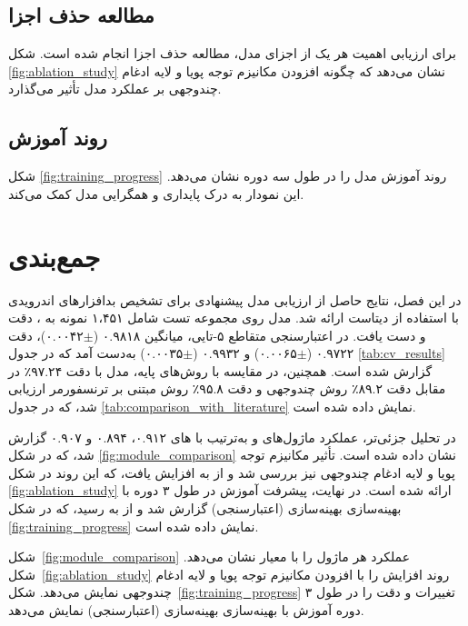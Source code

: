 \subsection{مطالعه حذف اجزا}
برای ارزیابی اهمیت هر یک از اجزای مدل، مطالعه حذف اجزا انجام شده است. شکل \ref{fig:ablation_study} نشان می‌دهد که چگونه افزودن مکانیزم توجه پویا و لایه ادغام چندوجهی بر عملکرد مدل تأثیر می‌گذارد.

\subsection{روند آموزش}
شکل \ref{fig:training_progress} روند آموزش مدل را در طول سه دوره نشان می‌دهد. این نمودار به درک پایداری و همگرایی مدل کمک می‌کند.

\section{جمع‌بندی}
در این فصل، نتایج حاصل از ارزیابی مدل پیشنهادی  برای تشخیص بدافزارهای اندرویدی با استفاده از دیتاست  \cite{Drebin} ارائه شد. مدل  روی مجموعه تست شامل ۱،۴۵۱ نمونه به  ، دقت  و   دست یافت. در اعتبارسنجی متقاطع ۵-تایی، میانگین  ۰.۹۸۱۸ ($\pm$۰.۰۰۴۲)، دقت ۰.۹۷۲۲ ($\pm$۰.۰۰۶۵) و  ۰.۹۹۳۲ ($\pm$۰.۰۰۳۵) به‌دست آمد که در جدول \ref{tab:cv_results} گزارش شده است. همچنین، در مقایسه با روش‌های پایه، مدل  با دقت ۹۷.۲۴٪ در مقابل دقت ۸۹.۲٪ روش چندوجهی \cite{Alsaleh2023} و دقت ۹۵.۸٪ روش مبتنی بر ترنسفورمر \cite{TransformerMalware} ارزیابی شد، که در جدول \ref{tab:comparison_with_literature} نمایش داده شده است.

در تحلیل جزئی‌تر، عملکرد ماژول‌های   و  به‌ترتیب با های ۰.۹۱۲، ۰.۸۹۴ و ۰.۹۰۷ گزارش شد، که در شکل \ref{fig:module_comparison} نشان داده شده است. تأثیر مکانیزم توجه پویا و لایه ادغام چندوجهی نیز بررسی شد و  از  به  افزایش یافت، که این روند در شکل \ref{fig:ablation_study} ارائه شده است. در نهایت، پیشرفت آموزش در طول ۳ دوره با بهینه‌سازی بهینه‌سازی (اعتبارسنجی) گزارش شد و  از  به  رسید، که در شکل \ref{fig:training_progress} نمایش داده شده است.

شکل~\ref{fig:module_comparison} عملکرد هر ماژول را با معیار  نشان می‌دهد. شکل~\ref{fig:ablation_study} روند افزایش  را با افزودن مکانیزم توجه پویا و لایه ادغام چندوجهی نمایش می‌دهد. شکل~\ref{fig:training_progress} تغییرات  و دقت را در طول ۳ دوره آموزش با بهینه‌سازی بهینه‌سازی (اعتبارسنجی) نمایش می‌دهد.

